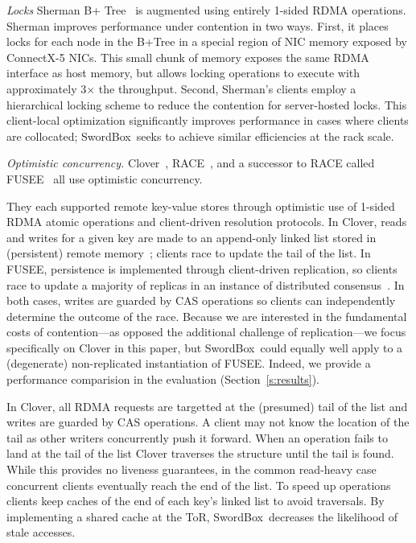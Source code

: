 \documentclass[12pt]{ucsddissertation}
\newcommand{\sword}{SwordBox}
\begin{document}
\emph{Locks}  Sherman B+ Tree~\cite{sherman} is augmented using entirely 1-sided RDMA operations. Sherman improves
performance under contention in two ways. First, it places locks for each node in the B+Tree in a
special region of NIC memory exposed by ConnectX-5 NICs.  This small chunk of memory exposes the
same RDMA interface as host memory, but allows locking operations to execute with approximately
3$\times$ the throughput.  Second, Sherman's clients employ a hierarchical locking scheme to reduce
the contention for server-hosted locks.  This client-local optimization significantly improves
performance in cases where clients are collocated; \sword\ seeks to achieve similar efficiencies at
the rack scale.


\emph{Optimistic concurrency.}  Clover~\cite{clover}, RACE~\cite{race}, and a successor to RACE
called FUSEE~\cite{fusee} all use optimistic concurrency.

They each supported remote key-value stores through optimistic use of
1-sided RDMA atomic operations and client-driven resolution protocols. 
In Clover, reads and writes for a given key are made to an append-only linked list stored in
(persistent) remote memory~\cite{clover}; clients race to update the tail of the list.  In FUSEE,
persistence is implemented through client-driven replication, so clients race to update a majority
of replicas in an instance of distributed consensus~\cite{fusee}.  In both cases, writes are guarded
by CAS operations so clients can independently determine the outcome of the race.  Because we are
interested in the fundamental costs of contention---as opposed the additional challenge of
replication---we focus specifically on Clover in this paper, but \sword\ could equally well apply to
a (degenerate) non-replicated instantiation of FUSEE.  Indeed, we provide a performance comparision
in the evaluation (Section~\ref{s:results}).

In Clover, all RDMA requests are targetted at the (presumed) tail of the list and writes are guarded
by CAS operations. A client may not know the location of the tail as other writers concurrently push
it forward. When an operation fails to land at the tail of the list Clover traverses the structure
until the tail is found. While this provides no liveness guarantees, in the common read-heavy case
concurrent clients eventually reach the end of the list. To speed up operations clients keep caches
of the end of each key's linked list to avoid traversals.  By implementing a shared cache at the
ToR, \sword\ decreases the likelihood of stale accesses.
\end{document}
